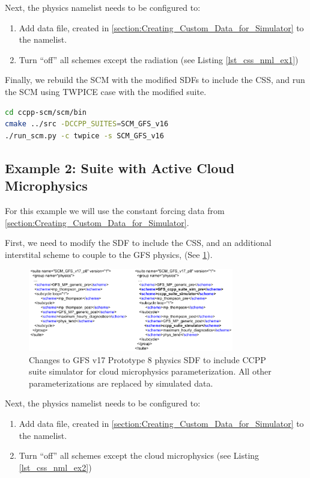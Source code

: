 Next, the physics namelist needs to be configured to:
\begin{enumerate}
\item Add data file,  created in \ref{section:Creating_Custom_Data_for_Simulator} to the namelist.
\item Turn ``off'' all schemes except the radiation (see Listing \ref{lst_css_nml_ex1})
\end{enumerate}

Finally, we rebuild the SCM with the modified SDFs to include the CSS, and run the SCM  using TWPICE case with the modified  suite.
\begin{lstlisting}[language=bash]
cd ccpp-scm/scm/bin
cmake ../src -DCCPP_SUITES=SCM_GFS_v16
./run_scm.py -c twpice -s SCM_GFS_v16
\end{lstlisting}

\subsection{Example 2: Suite with Active Cloud Microphysics}
\label{section:Suite_with_Active_cldmp}

For this example we will use the constant forcing data from \ref{section:Creating_Custom_Data_for_Simulator}.

First, we need to modify the SDF to include the CSS,  and an additional interstital scheme to couple to the GFS physics,  (See \ref{fig:CSS_SDF_ex2}).

\begin{figure}[h]
    \centering
    \includegraphics[width=0.80\textwidth]{images/SDF_changes_for_CSS_ex2.png}
    \caption{Changes to GFS v17 Prototype 8 physics SDF to include CCPP suite simulator for  cloud microphysics parameterization. All other parameterizations are replaced by simulated data.}
    \label{fig:CSS_SDF_ex2}
\end{figure}

Next, the physics namelist needs to be configured to:
\begin{enumerate}
\item Add data file,  created in \ref{section:Creating_Custom_Data_for_Simulator} to the namelist.
\item Turn ``off'' all schemes except the cloud microphysics (see Listing \ref{lst_css_nml_ex2})
\end{enumerate}

